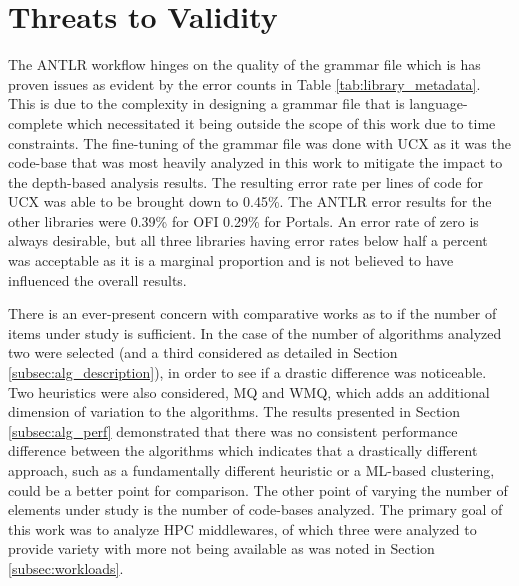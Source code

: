 \section{Threats to Validity}
\label{sec:validity}


The ANTLR workflow hinges on the quality of the grammar file which is has proven issues as evident by the error counts in Table \ref{tab:library_metadata}. This is due to the complexity in designing a grammar file that is language-complete which necessitated it being outside the scope of this work due to time constraints. The fine-tuning of the grammar file was done with UCX as it was the code-base that was most heavily analyzed in this work to mitigate the impact to the depth-based analysis results. The resulting error rate per lines of code for UCX was able to be brought down to 0.45\%. The ANTLR error results for the other libraries were 0.39\% for OFI 0.29\% for Portals. An error rate of zero is always desirable, but all three libraries having error rates below half a percent was acceptable as it is a marginal proportion and is not believed to have influenced the overall results.

There is an ever-present concern with comparative works as to if the number of items under study is sufficient. In the case of the number of algorithms analyzed two were selected (and a third considered as detailed in Section \ref{subsec:alg_description}), in order to see if a drastic difference was noticeable. Two heuristics were also considered, MQ and WMQ, which adds an additional dimension of variation to the algorithms. The results presented in Section \ref{subsec:alg_perf} demonstrated that there was no consistent performance difference between the algorithms which indicates that a drastically different approach, such as a fundamentally different heuristic or a ML-based clustering, could be a better point for comparison. The other point of varying the number of elements under study is the number of code-bases analyzed. The primary goal of this work was to analyze HPC middlewares, of which three were analyzed to provide variety with more not being available as was noted in Section \ref{subsec:workloads}.

